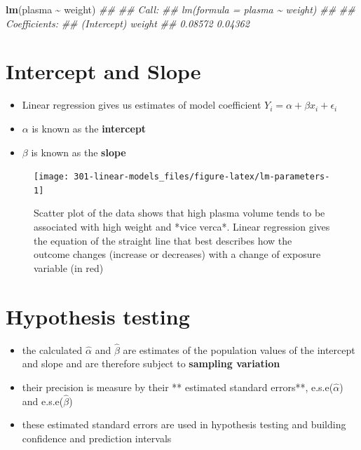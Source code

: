 \documentclass[
]{book}
\newenvironment{Shaded}{\begin{snugshade}}{\end{snugshade}}
\newcommand{\CommentTok}[1]{\textcolor[rgb]{0.56,0.35,0.01}{\textit{#1}}}
\newcommand{\KeywordTok}[1]{\textcolor[rgb]{0.13,0.29,0.53}{\textbf{#1}}}
\newcommand{\NormalTok}[1]{#1}
\newcommand{\OperatorTok}[1]{\textcolor[rgb]{0.81,0.36,0.00}{\textbf{#1}}}
\newcommand{\StringTok}[1]{\textcolor[rgb]{0.31,0.60,0.02}{#1}}
\providecommand{\tightlist}{%
  \setlength{\itemsep}{0pt}\setlength{\parskip}{0pt}}
\theoremstyle{definition}
\theoremstyle{definition}
\theoremstyle{definition}
\theoremstyle{remark}
\begin{document}
\begin{Shaded}
\begin{Highlighting}[]
\KeywordTok{lm}\NormalTok{(plasma }\OperatorTok{\textasciitilde{}}\StringTok{ }\NormalTok{weight)}
\CommentTok{\#\# }
\CommentTok{\#\# Call:}
\CommentTok{\#\# lm(formula = plasma \textasciitilde{} weight)}
\CommentTok{\#\# }
\CommentTok{\#\# Coefficients:}
\CommentTok{\#\# (Intercept)       weight  }
\CommentTok{\#\#     0.08572      0.04362}
\end{Highlighting}
\end{Shaded}

\hypertarget{intercept-and-slope}{%
\section{Intercept and Slope}\label{intercept-and-slope}}

\begin{itemize}
\tightlist
\item
  Linear regression gives us estimates of model coefficient \(Y_i = \alpha + \beta x_i + \epsilon_i\)
\item
  \(\alpha\) is known as the \textbf{intercept}
\item
  \(\beta\) is known as the \textbf{slope}
\end{itemize}

\begin{figure}

{\centering \texttt{[image: 301-linear-models\_files/figure-latex/lm-parameters-1]} 

}

\caption{Scatter plot of the data shows that high plasma volume tends to be associated with high weight and *vice verca*. Linear regression gives the equation of the straight line that best describes how the outcome changes (increase or decreases) with a change of exposure variable (in red)}\label{fig:lm-parameters}
\end{figure}

\hypertarget{hypothesis-testing}{%
\section{Hypothesis testing}\label{hypothesis-testing}}

\begin{itemize}
\tightlist
\item
  the calculated \(\hat{\alpha}\) and \(\hat{\beta}\) are estimates of the population values of the intercept and slope and are therefore subject to \textbf{sampling variation}
\item
  their precision is measure by their ** estimated standard errors**, e.s.e(\(\hat{\alpha}\)) and e.s.e(\(\hat{\beta}\))
\item
  these estimated standard errors are used in hypothesis testing and building confidence and prediction intervals
\end{itemize}
\end{document}
